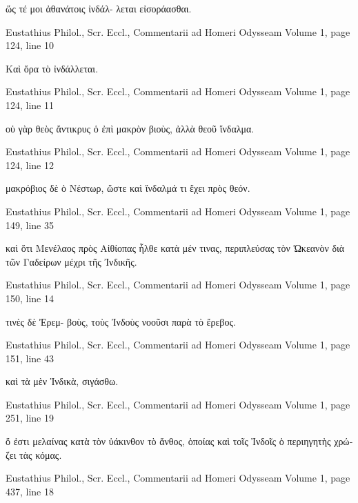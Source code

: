 \documentclass[12pt,letterpaper,twoside,final]{memoir}
\begin{document}
\begin{greek}
                                                                                   ὥς τέ μοι ἀθανάτοις ἰνδάλ-
λεται εἰσοράασθαι. 



Eustathius Philol., Scr. Eccl., Commentarii ad Homeri Odysseam 
Volume 1, page 124, line 10

                                                       Καὶ ὅρα τὸ ἰνδάλλεται. 



Eustathius Philol., Scr. Eccl., Commentarii ad Homeri Odysseam 
Volume 1, page 124, line 11

                                                                                     οὐ γὰρ θεὸς ἄντικρυς ὁ ἐπὶ 
μακρὸν βιοὺς, ἀλλὰ θεοῦ ἴνδαλμα. 



Eustathius Philol., Scr. Eccl., Commentarii ad Homeri Odysseam 
Volume 1, page 124, line 12

         μακρόβιος δὲ ὁ Νέστωρ, ὥστε καὶ ἴνδαλμά τι ἔχει πρὸς θεόν. 



Eustathius Philol., Scr. Eccl., Commentarii ad Homeri Odysseam 
Volume 1, page 149, line 35

                                                    καὶ ὅτι Μενέλαος πρὸς Αἰθίοπας ἦλθε κατὰ μέν τινας, 
περιπλεύσας τὸν Ὠκεανὸν διὰ τῶν Γαδείρων μέχρι τῆς Ἰνδικῆς. 



Eustathius Philol., Scr. Eccl., Commentarii ad Homeri Odysseam 
Volume 1, page 150, line 14

                                                                                                  τινὲς δὲ Ἐρεμ-
βοὺς, τοὺς Ἰνδοὺς νοοῦσι παρὰ τὸ ἔρεβος. 



Eustathius Philol., Scr. Eccl., Commentarii ad Homeri Odysseam 
Volume 1, page 151, line 43

     καὶ τὰ μὲν Ἰνδικὰ, σιγάσθω. 



Eustathius Philol., Scr. Eccl., Commentarii ad Homeri Odysseam 
Volume 1, page 251, line 19

                                                                                                                      ὅ ἐστι 
μελαίνας κατὰ τὸν ὑάκινθον τὸ ἄνθος, ὁποίας καὶ τοῖς Ἰνδοῖς ὁ περιηγητὴς χρώζει τὰς κόμας. 



Eustathius Philol., Scr. Eccl., Commentarii ad Homeri Odysseam 
Volume 1, page 437, line 18


\end{greek}
\end{document}
